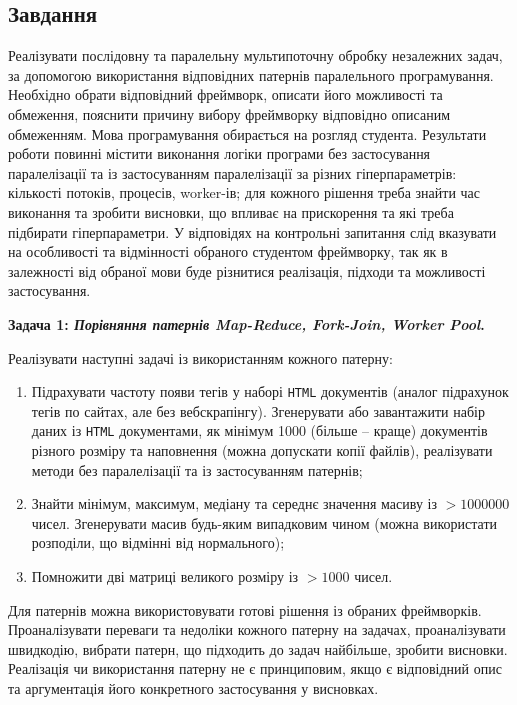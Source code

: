 \documentclass[14pt, a4paper]{extreport}
\begin{document}
	\subsection*{Завдання}
	
	Реалізувати послідовну та паралельну мультипоточну обробку незалежних задач, за допомогою використання відповідних патернів паралельного програмування. Необхідно обрати відповідний фреймворк, описати його можливості та обмеження, пояснити причину вибору фреймворку відповідно описаним обмеженням. Мова програмування обирається на розгляд студента. Результати роботи повинні містити виконання логіки програми без застосування паралелізації та із застосуванням паралелізації за різних гіперпараметрів: кількості потоків, процесів, worker-ів; для кожного рішення треба знайти час виконання та зробити висновки, що впливає на прискорення та які треба підбирати гіперпараметри. У відповідях на контрольні запитання слід вказувати на особливості та відмінності обраного студентом фреймворку, так як в залежності від обраної мови буде різнитися реалізація, підходи та можливості застосування.
	
	\textbf{Задача 1: \textit{Порівняння патернів Map-Reduce, Fork-Join, Worker Pool}.}
	
	Реалізувати наступні задачі із використанням кожного патерну:
	
	\begin{enumerate}
		\item Підрахувати частоту появи тегів у наборі \texttt{HTML} документів (аналог підрахунок тегів по сайтах, але без вебскрапінгу). Згенерувати або завантажити набір даних із \texttt{HTML} документами, як мінімум 1000 (більше -- краще) документів різного розміру та наповнення (можна допускати копії файлів), реалізувати методи без паралелізації та із застосуванням патернів;
		
		\item Знайти мінімум, максимум, медіану та середнє значення масиву із $ > 1 000 000$ чисел. Згенерувати масив будь-яким випадковим чином (можна використати розподіли, що відмінні від нормального);
		
		\item Помножити дві матриці великого розміру із $ > 1 000$ чисел.
	\end{enumerate}
	
	Для патернів можна використовувати готові рішення із обраних фреймворків. Проаналізувати переваги та недоліки кожного патерну на задачах, проаналізувати швидкодію, вибрати патерн, що підходить до задач найбільше, зробити висновки. Реалізація чи використання патерну не є принциповим, якщо є відповідний опис та аргументація його конкретного застосування у висновках.
	
\end{document}
